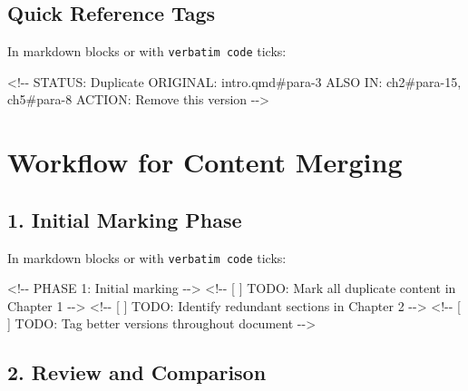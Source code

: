 \documentclass[
  11pt,
  letterpaper,
]{book}
\newenvironment{Shaded}{\begin{snugshade}}{\end{snugshade}}
\newcommand{\AlertTok}[1]{\textcolor[rgb]{0.68,0.00,0.00}{#1}}
\newcommand{\CommentTok}[1]{\textcolor[rgb]{0.37,0.37,0.37}{#1}}
\begin{document}
\subsection*{Quick Reference Tags}\label{quick-reference-tags}

In markdown blocks or with \texttt{verbatim\ code} ticks:

\begin{Shaded}
\begin{Highlighting}[]
\CommentTok{\textless{}!{-}{-} }
\CommentTok{  STATUS: Duplicate}
\CommentTok{  ORIGINAL: intro.qmd\#para{-}3}
\CommentTok{  ALSO IN: ch2\#para{-}15, ch5\#para{-}8}
\CommentTok{  ACTION: Remove this version}
\CommentTok{{-}{-}\textgreater{}}
\end{Highlighting}
\end{Shaded}

\section*{Workflow for Content
Merging}\label{workflow-for-content-merging}


\subsection*{1. Initial Marking Phase}\label{initial-marking-phase}

In markdown blocks or with \texttt{verbatim\ code} ticks:

\begin{Shaded}
\begin{Highlighting}[]
\CommentTok{\textless{}!{-}{-} PHASE 1: Initial marking {-}{-}\textgreater{}}
\CommentTok{\textless{}!{-}{-} [ ] }\AlertTok{TODO}\CommentTok{: Mark all duplicate content in Chapter 1 {-}{-}\textgreater{}}
\CommentTok{\textless{}!{-}{-} [ ] }\AlertTok{TODO}\CommentTok{: Identify redundant sections in Chapter 2 {-}{-}\textgreater{}}
\CommentTok{\textless{}!{-}{-} [ ] }\AlertTok{TODO}\CommentTok{: Tag better versions throughout document {-}{-}\textgreater{}}
\end{Highlighting}
\end{Shaded}

\subsection*{2. Review and Comparison}\label{review-and-comparison}
\end{document}
